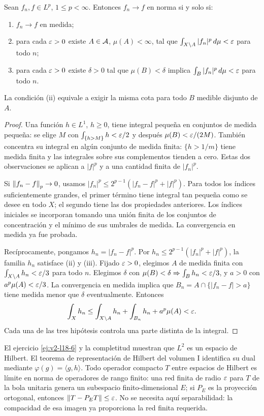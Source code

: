 \begin{teorema}[Vitali en $L^p$]\label{v2:vitali-p}
Sean $f_n,f\in L^p$, $1\le p<\infty$. Entonces $f_n\to f$ en norma si y solo si:
\begin{enumerate}
\item $f_n\to f$ en medida;
\item para cada $\varepsilon>0$ existe $A\in\mathcal A$, $\mu(A)<\infty$, tal que $\int_{X\setminus A}|f_n|^p\,d\mu<\varepsilon$ para todo $n$;
\item para cada $\varepsilon>0$ existe $\delta>0$ tal que $\mu(B)<\delta$ implica $\int_B|f_n|^p\,d\mu<\varepsilon$ para todo $n$.
\end{enumerate}
La condición (ii) equivale a exigir la misma cota para todo $B$ medible disjunto de $A$.
\end{teorema}
\begin{proof}
Una función $h\in L^1$, $h\ge0$, tiene integral pequeña en conjuntos de medida pequeña: se elige $M$ con $\int_{\{h>M\}}h<\varepsilon/2$ y después $\mu(B)<\varepsilon/(2M)$. También concentra su integral en algún conjunto de medida finita: $\{h>1/m\}$ tiene medida finita y las integrales sobre sus complementos tienden a cero. Estas dos observaciones se aplican a $|f|^p$ y a una cantidad finita de $|f_n|^p$.

Si $\left\lVert f_n-f\right\rVert_p\to0$, usamos $|f_n|^p\le2^{p-1}(|f_n-f|^p+|f|^p)$. Para todos los índices suficientemente grandes, el primer término tiene integral tan pequeña como se desee en todo $X$; el segundo tiene las dos propiedades anteriores. Los índices iniciales se incorporan tomando una unión finita de los conjuntos de concentración y el mínimo de sus umbrales de medida. La convergencia en medida ya fue probada.

Recíprocamente, pongamos $h_n=|f_n-f|^p$. Por $h_n\le2^{p-1}(|f_n|^p+|f|^p)$, la familia $h_n$ satisface (ii) y (iii). Fijado $\varepsilon>0$, elegimos $A$ de medida finita con $\int_{X\setminus A}h_n<\varepsilon/3$ para todo $n$. Elegimos $\delta$ con $\mu(B)<\delta\Rightarrow\int_Bh_n<\varepsilon/3$, y $a>0$ con $a^p\mu(A)<\varepsilon/3$. La convergencia en medida implica que $B_n=A\cap\{|f_n-f|>a\}$ tiene medida menor que $\delta$ eventualmente. Entonces
\[
 \int_Xh_n\le\int_{X\setminus A}h_n+\int_{B_n}h_n+a^p\mu(A)<\varepsilon.
\]
Cada una de las tres hipótesis controla una parte distinta de la integral.
\end{proof}
\begin{observacion}
El ejercicio \ref{ej:v2-l18-6} y la completitud muestran que $L^2$ es un espacio de Hilbert. El teorema de representación de Hilbert del volumen I identifica su dual mediante $\varphi(g)=\langle g,h\rangle$. Todo operador compacto $T$ entre espacios de Hilbert es límite en norma de operadores de rango finito: una red finita de radio $\varepsilon$ para $T$ de la bola unitaria genera un subespacio finito-dimensional $E$; si $P_E$ es la proyección ortogonal, entonces $\left\lVert T-P_ET\right\rVert\le\varepsilon$. No se necesita aquí separabilidad: la compacidad de esa imagen ya proporciona la red finita requerida.
\end{observacion}

